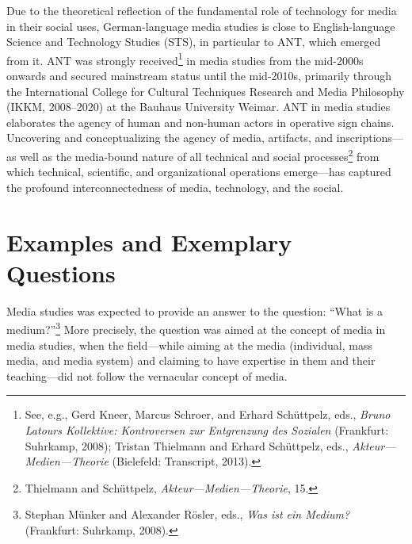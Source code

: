 \documentclass{tufte-handout}
\begin{document}
Due to the theoretical reflection of the fundamental role of technology
for media in their social uses, German-language media studies is close
to English-language Science and Technology Studies (STS), in particular
to ANT, which emerged from it. ANT was strongly received\footnote{See,
  e.g., Gerd Kneer, Marcus Schroer, and Erhard Schüttpelz, eds.,
  \emph{Bruno Latours Kollektive: Kontroversen zur Entgrenzung des
  Sozialen} (Frankfurt: Suhrkamp, 2008); Tristan Thielmann and Erhard
  Schüttpelz, eds., \emph{Akteur---Medien---Theorie} (Bielefeld:
  Transcript, 2013).} in media studies from the mid-2000s onwards and
secured mainstream status until the mid-2010s, primarily through the
International College for Cultural Techniques Research and Media
Philosophy (IKKM, 2008--2020) at the Bauhaus University Weimar. ANT in
media studies elaborates the agency of human and non-human actors in
operative sign chains. Uncovering and conceptualizing the agency of
media, artifacts, and inscriptions---as well as the media-bound nature
of all technical and social processes\footnote{Thielmann and Schüttpelz,
  \emph{Akteur---Medien---Theorie}, 15.} from which technical,
scientific, and organizational operations emerge---has captured the
profound interconnectedness of media, technology, and the social.

\hypertarget{examples-and-exemplary-questions}{%
\section{Examples and Exemplary
Questions}\label{examples-and-exemplary-questions}}

Media studies was expected to provide an answer to the question: ``What
is a medium?''\footnote{Stephan Münker and Alexander Rösler, eds.,
  \emph{Was ist ein Medium?} (Frankfurt: Suhrkamp, 2008).} More
precisely, the question was aimed at the concept of media in media
studies, when the field---while aiming at the media (individual, mass
media, and media system) and claiming to have expertise in them and
their teaching---did not follow the vernacular concept of media.
\end{document}
